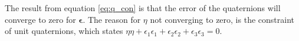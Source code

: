 The result from equation \eqref{eq:q_con} is that the error of the quaternions will converge to zero for $\boldsymbol{\epsilon}$. The reason for $\eta$ not converging to zero, is the constraint of unit quaternions, which states $\eta \eta + \epsilon_1 \epsilon_1 + \epsilon_2 \epsilon_2 + \epsilon_3 \epsilon_3 = 0$. 




